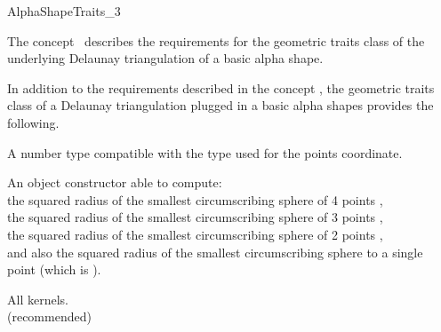 \begin{ccRefConcept} {AlphaShapeTraits_3}


\ccDefinition
The concept \ccRefName\ describes the requirements 
for the geometric traits class
of  the underlying  Delaunay triangulation of a basic alpha shape.



\ccRefines
{}

In addition to the requirements described in the concept 
,
the geometric traits class of a
Delaunay triangulation plugged in a basic alpha shapes
provides the following.


\ccTypes

 {A number type compatible with the type used for
  the points coordinate.}

{An object constructor able to compute: \\
the squared radius of the
 smallest circumscribing sphere  of  4 points ,\\
the squared radius of the
smallest circumscribing sphere of  3 points ,\\
the squared radius of the smallest  circumscribing sphere
of 2 points , \\
and also the squared radius of the smallest circumscribing sphere
to a single point  (which is ).} 


\ccCreation
{}
\ccThreeToTwo



\ccAccessFunctions
{} {}

\ccHasModels
All  kernels.\\
 (recommended)\\
\\
\\
\\
\\
\\


\end{ccRefConcept}
